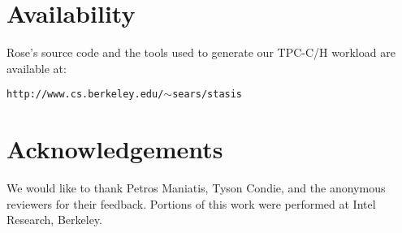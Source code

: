 \documentclass{vldb}
\newcommand{\rowss}{Rose's\xspace}
\begin{document}
\section{Availability}
\label{sec:avail}
\rowss source code and the tools used to generate our TPC-C/H workload
are available at:

{\tt http://www.cs.berkeley.edu/$\sim$sears/stasis}

\section{Acknowledgements}

We would like to thank Petros Maniatis, Tyson Condie, and the
anonymous reviewers for their feedback.  Portions of this work were
performed at Intel Research, Berkeley.


%
%
\balancecolumns %
\end{document}
